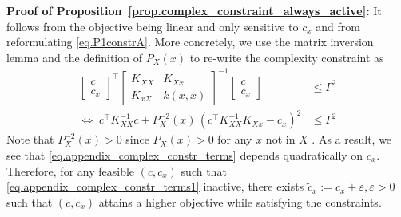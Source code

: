 \begin{my_proof}
	\textbf{Proof of Proposition~\ref{prop.complex_constraint_always_active}:}
	It follows from the objective being linear and only sensitive to $c_x$ and from reformulating \eqref{eq.P1constrA}. More concretely, we use the matrix inversion lemma and the definition of $P_X(x)$ to re-write the complexity constraint as
	\begin{subequations}
		\begin{align}
			\begin{bmatrix}
				c \\
				c_x
			\end{bmatrix}^\top 
			\begin{bmatrix}
				K_{XX} & K_{Xx} \\
				K_{xX } & k(x,x)
			\end{bmatrix}^{-1} 
			\begin{bmatrix}
				c \\
				c_x
			\end{bmatrix} & \leq \Gamma^2 
		   \label{eq.appendix_complex_constr_terms1}
		   \\
			\Leftrightarrow \;
			c^\top K^{-1}_{XX} c
			+
			P_{X}^{-2}(x) \, \left( c^\top K_{XX}^{-1} K_{Xx} - c_x \right)^2 
			&\leq \Gamma^2 
			\label{eq.appendix_complex_constr_terms}
		\end{align}
	\end{subequations}
	Note that $P_X^{-2}(x) > 0$ since $P_X(x) > 0$ for any $x$ not in $X$ \citep{karvonen2022error}. As a result, we see that \eqref{eq.appendix_complex_constr_terms} depends quadratically on $c_x$. Therefore, for any feasible $(c, c_x)$ such that \eqref{eq.appendix_complex_constr_terms1} inactive, there exists $ \tilde c_x := c_x + \varepsilon, \varepsilon > 0$ such that $(c,\tilde c_x)$ attains a higher objective while satisfying the constraints.
\end{my_proof}

